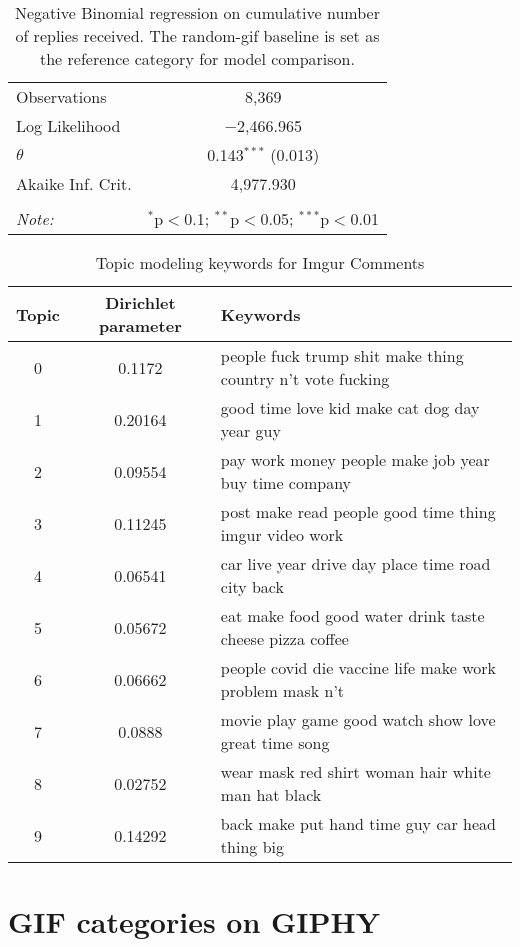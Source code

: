 \begin{table*}[!htbp]
\begin{tabular}{@{\extracolsep{3pt}}lc}
Observations & 8,369 \\ 
Log Likelihood & $-$2,466.965 \\ 
$\theta$ & 0.143$^{***}$  (0.013) \\ 
Akaike Inf. Crit. & 4,977.930 \\ 
\hline 
\hline \\[-1.8ex] 
\textit{Note:}  & \multicolumn{1}{r}{$^{*}$p$<$0.1; $^{**}$p$<$0.05; $^{***}$p$<$0.01} \\ 
\end{tabular} 
  \caption{Negative Binomial regression on cumulative number of replies received. The random-gif baseline is set as the reference category for model comparison. } 
  \label{table:num-replies-regression} 
\end{table*} 


\begin{table*}
\centering
\begin{tabular}{ccl}
\toprule \hline
\textbf{Topic} & \textbf{Dirichlet parameter} & \textbf{Keywords} \\
\midrule
0 & 0.1172 & people fuck trump shit make thing country n’t vote fucking \\ 
1 & 0.20164 & good time love kid make cat dog day year guy \\ 
2 & 0.09554 & pay work money people make job year buy time company \\ 
3 & 0.11245 & post make read people good time thing imgur video work \\ 
4 & 0.06541 & car live year drive day place time road city back \\ 
5 & 0.05672 & eat make food good water drink taste cheese pizza coffee \\ 
6 & 0.06662 & people covid die vaccine life make work problem mask n’t \\ 
7 & 0.0888 & movie play game good watch show love great time song \\ 
8 & 0.02752 & wear mask red shirt woman hair white man hat black \\ 
9 & 0.14292 & back make put hand time guy car head thing big \\
\hline
\bottomrule
\end{tabular}
\caption{Topic modeling keywords for Imgur Comments} 
\label{table:topic-model-keywords} 
\end{table*}


\section{GIF categories on GIPHY}
\label{appendix:GIFCategories}

